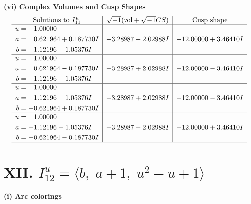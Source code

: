 \documentclass[1p]{elsarticle_modified}
\theoremstyle{definition}
\newcommand{\I}{\sqrt{-1}}
\begin{document}
\newpage\flushleft \textbf{(vi) Complex Volumes and Cusp Shapes}
$$\begin{array}{c|c|c}  
\text{Solutions to }I^u_{11}& \I (\text{vol} + \sqrt{-1}CS) & \text{Cusp shape}\\
 \hline 
\begin{aligned}
u &= \phantom{-}1.00000\phantom{ +0.000000I} \\
a &= \phantom{-}0.621964 + 0.187730 I \\
b &= \phantom{-}1.12196 + 1.05376 I\end{aligned}
 & -3.28987 - 2.02988 I & -12.00000 + 3.46410 I \\ \hline\begin{aligned}
u &= \phantom{-}1.00000\phantom{ +0.000000I} \\
a &= \phantom{-}0.621964 - 0.187730 I \\
b &= \phantom{-}1.12196 - 1.05376 I\end{aligned}
 & -3.28987 + 2.02988 I & -12.00000 - 3.46410 I \\ \hline\begin{aligned}
u &= \phantom{-}1.00000\phantom{ +0.000000I} \\
a &= -1.12196 + 1.05376 I \\
b &= -0.621964 + 0.187730 I\end{aligned}
 & -3.28987 + 2.02988 I & -12.00000 - 3.46410 I \\ \hline\begin{aligned}
u &= \phantom{-}1.00000\phantom{ +0.000000I} \\
a &= -1.12196 - 1.05376 I \\
b &= -0.621964 - 0.187730 I\end{aligned}
 & -3.28987 - 2.02988 I & -12.00000 + 3.46410 I\\
 \hline 
 \end{array}$$\newpage\newpage\renewcommand{\arraystretch}{1}
\centering \section*{XII. $I^u_{12}= \langle b,\;a+1,\;u^2- u+1 \rangle$}
\flushleft \textbf{(i) Arc colorings}\\
\end{document}
